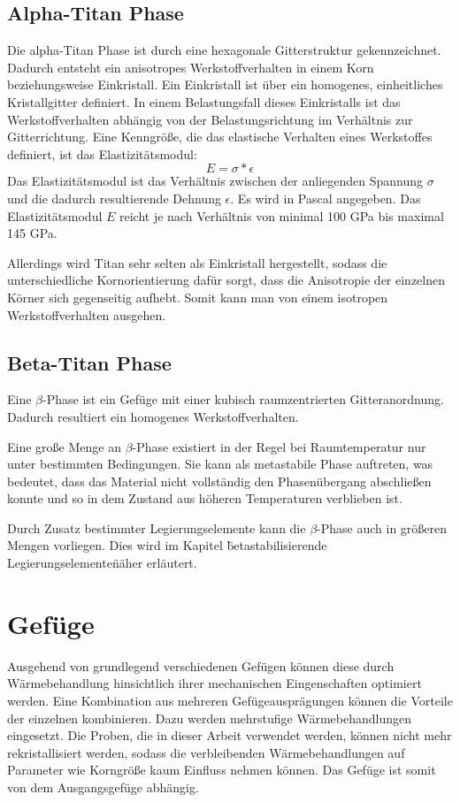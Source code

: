 \documentclass[a4paper, 11pt]{tubsreprt}
\begin{document}
\subsection{Alpha-Titan Phase}
Die alpha-Titan Phase ist durch eine hexagonale Gitterstruktur gekennzeichnet. Dadurch entsteht ein anisotropes Werkstoffverhalten in einem Korn beziehungsweise Einkristall.
Ein Einkristall ist über ein homogenes, einheitliches Kristallgitter definiert.
In einem Belastungsfall dieses Einkristalls ist das Werkstoffverhalten abhängig von der Belastungsrichtung im Verhältnis zur Gitterrichtung. Eine Kenngröße, die das elastische Verhalten eines Werkstoffes definiert, ist das Elastizitätsmodul: 
\begin{equation}
E=\sigma*\epsilon
\end{equation}
Das Elastizitätsmodul ist das Verhältnis zwischen der anliegenden Spannung $\sigma$ und die dadurch resultierende Dehnung $\epsilon$.
Es wird in Pascal angegeben. Das Elastizitätsmodul $E$ reicht je nach Verhältnis von minimal 100 GPa bis maximal 145 GPa. 

Allerdings wird Titan sehr selten als Einkristall hergestellt, sodass die unterschiedliche Kornorientierung dafür sorgt, dass die Anisotropie der einzelnen Körner sich gegenseitig aufhebt. Somit kann man von einem isotropen Werkstoffverhalten ausgehen.


\subsection{Beta-Titan Phase}
Eine $\beta$-Phase ist ein Gefüge mit einer kubisch raumzentrierten Gitteranordnung. Dadurch resultiert ein homogenes Werkstoffverhalten.

Eine große Menge an $\beta$-Phase existiert in der Regel bei Raumtemperatur nur unter bestimmten Bedingungen. Sie kann als metastabile Phase auftreten, was bedeutet, dass das Material nicht vollständig den Phasenübergang abschließen konnte und so in dem Zustand aus höheren Temperaturen verblieben ist.  

Durch Zusatz bestimmter Legierungselemente kann die $\beta$-Phase auch in größeren Mengen vorliegen. Dies wird im Kapitel \"betastabilisierende Legierungselemente\" näher erläutert.
\section{Gefüge}
Ausgehend von grundlegend verschiedenen Gefügen können diese durch Wärmebehandlung hinsichtlich ihrer mechanischen Eingenschaften optimiert werden. Eine Kombination aus mehreren Gefügeausprägungen können die Vorteile der einzelnen kombinieren. Dazu werden mehrstufige Wärmebehandlungen eingesetzt. Die Proben, die in dieser Arbeit verwendet werden, können nicht mehr rekristallisiert werden, sodass die verbleibenden Wärmebehandlungen auf Parameter wie Korngröße kaum Einfluss nehmen können. Das Gefüge ist somit von dem Ausgangsgefüge abhängig.  
\end{document}
